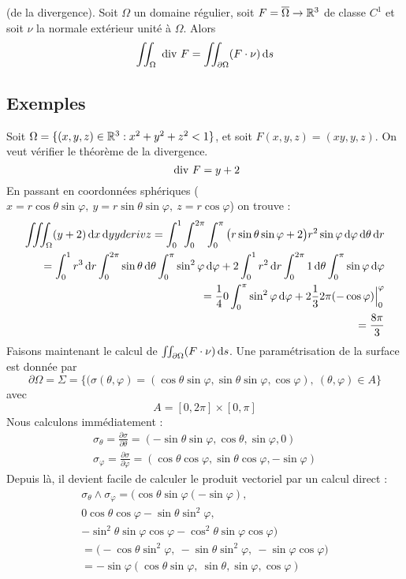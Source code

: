 \documentclass[12pt,a4paper]{article}
\begin{document}
\begin{boite}
	 (de la divergence). Soit $\Omega$ un domaine régulier, soit $F = \overline{\Omega} \to \mathbb{R}^3$ de classe $C^1$ et soit $\nu$ la normale extérieur unité à $\Omega$. Alors 
	\begin{equation}
		\iint_\Omega \text{ div } F = \iint_{\partial\Omega} (F \cdot \nu) \, \mathrm d s
	\end{equation}
\end{boite}
\subsection{Exemples}
 Soit $\Omega = \{ (x,y,z) \in \mathbb{R}^3: x^2 + y^2 + z^2 < 1\}$, et soit $F(x,y,z) = (xy,y,z)$. On veut vérifier le théorème de la divergence. 
\[\text{ div } F = y + 2\]
En passant en coordonnées sphériques ($x = r\cos\theta \sin \varphi,\ y = r \sin\theta\sin\varphi,\ z = r \cos\varphi$) on trouve :
\begin{align*}
	\iiint_\Omega (y+2) \, \mathrm d x\, \mathrm d yyderiv{z} = \int_0^1 \int_0^{2\pi} \int_0^{\pi} \big(r\sin\theta\sin\varphi + 2\big)r^2 \sin\varphi \, \mathrm d \varphi\, \mathrm d \theta\, \mathrm d r\\
	= \int_0^1 r^3 \, \mathrm d r \int_0^{2\pi} \sin\theta \, \mathrm d \theta \int_0^\pi \sin^2\varphi \, \mathrm d \varphi + 2 \int_0^1 r^2 \, \mathrm d r \int_0^{2\pi} 1 \, \mathrm d \theta \int_0^\pi \sin\varphi \, \mathrm d \varphi\\
	= \frac{1}{4}0 \int_0^\pi \sin^2 \varphi \, \mathrm d \varphi + 2 \frac{1}{3}2\pi(-\cos\varphi)\Big|_0^\varphi\\
	= \frac{8\pi}{3}
\end{align*}
Faisons maintenant le calcul de $\iint_{\partial\Omega} (F\cdot \nu) \, \mathrm d s$. Une paramétrisation de la surface est donnée par 
\[\partial\Omega = \Sigma = \{(\sigma(\theta,\varphi) = (\cos\theta\sin\varphi, \sin\theta\sin\varphi,\cos\varphi),\ (\theta,\varphi) \in A\}\] avec \[A = [0,2\pi] \times [0,\pi]\]
Nous calculons immédiatement :
\begin{align*}
	\sigma_\theta = \frac{\partial \sigma}{\partial \theta} = (-\sin\theta\sin\varphi, \cos\theta,\sin\varphi, 0)\\
	\sigma_\varphi = \frac{\partial \sigma}{\partial \varphi} = (\cos\theta \cos\varphi, \sin\theta\cos\varphi, -\sin\varphi)
\end{align*}
Depuis là, il devient facile de calculer le produit vectoriel par un calcul direct :
\begin{align*}
	\sigma_\theta \wedge \sigma_\varphi = \Bigg(\cos\theta\sin\varphi(-\sin\varphi),\\ 0\cos\theta\cos\varphi - \sin\theta\sin^2 \varphi,\\ -\sin^2\theta \sin\varphi \cos\varphi - \cos^2\theta\sin\varphi\cos\varphi\Bigg)\\
	= \Big(-\cos\theta\sin^2\varphi,\ - \sin\theta\sin^2 \varphi,\ -\sin\varphi\cos\varphi \Big)\\
	= -\sin\varphi(\cos\theta\sin\varphi,\ \sin\theta,\sin\varphi,\cos\varphi)
\end{align*}
\end{document}
